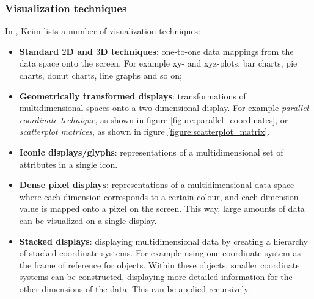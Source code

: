 \subsubsection{Visualization techniques}\label{chapter:literature_study:section:interaction:subsection:techniques:subsubsection:infovis}


In \cite{keim:2002}, Keim lists a number of visualization techniques:

\begin{itemize}
	\item \textbf{Standard $2$D and $3$D techniques}: one-to-one data mappings from the data space onto the screen. For example xy- and xyz-plots, bar charts, pie charts, donut charts, line graphs and so on;
	\item \textbf{Geometrically transformed displays}: transformations of multidimensional spaces onto a two-dimensional display. For example \emph{parallel coordinate technique}, as shown in figure \ref{figure:parallel_coordinates}, or \emph{scatterplot matrices}, as shown in figure \ref{figure:scatterplot_matrix}.
	\item \textbf{Iconic displays/glyphs}: representations of a multidimensional set of attributes in a single icon\cite{keim:2002, ware:2004}.
	\item \textbf{Dense pixel displays}: representations of a multidimensional data space where each dimension corresponds to a certain colour, and each dimension value is mapped onto a pixel on the screen. This way, large amounts of data can be visualized on a single display.
	\item \textbf{Stacked displays}: displaying multidimensional data by creating a hierarchy of stacked coordinate systems. For example using one coordinate system as the frame of reference for objects. Within these objects, smaller coordinate systems can be constructed, displaying more detailed information for the other dimensions of the data. This can be applied recursively\cite{keim:2002}.
\end{itemize}


